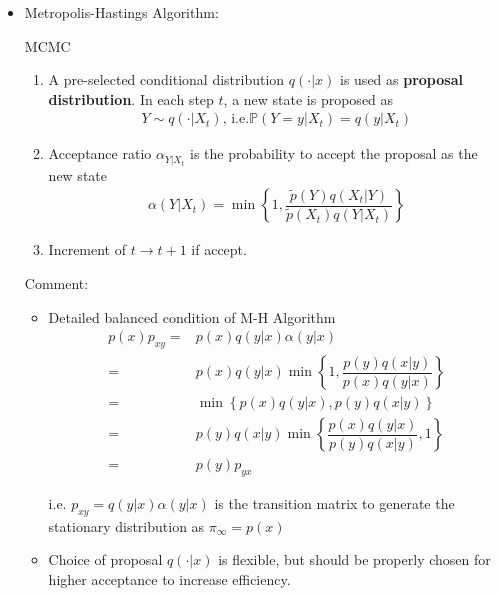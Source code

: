 \begin{itemize}[topsep=2pt,itemsep=0pt]
    \item Metropolis-Hastings Algorithm:
    \begin{algorithm}{MCMC}
    \begin{enumerate}[topsep=2pt,itemsep=2pt]
        \item A pre-selected conditional distribution $ q(\cdot|x) $ is used as \textbf{proposal distribution}. In each step $ t $, a new state is proposed as 
        \begin{align}
            Y\sim q(\cdot|X_t), \,\mathrm{i.e. }\mathbb{P}\left( Y=y|X_t \right) =q(y|X_t)
        \end{align}
        \item Acceptance ratio $ \alpha_{Y|X_t}  $ is the probability to accept the proposal as the new state
        \begin{align}
            \alpha (Y|X_t)= \min\left\{ 1,\dfrac{\tilde{p}(Y)q(X_t|Y)}{\tilde{p}(X_t)q(Y|X_t)} \right\}
        \end{align}
        \item Increment of $ t\to t+1 $ if accept.
    \end{enumerate}

    \end{algorithm}
        

    Comment: 
    \begin{itemize}[topsep=2pt,itemsep=0pt]
        \item Detailed balanced condition of M-H Algorithm
\begin{align}
    p(x)p_{xy}=&p(x)q(y|x)\alpha (y|x)\\
    =& p(x)q(y|x)\min\left\{ 1,\dfrac{p(y)q(x|y)}{p(x)q(y|x)} \right\}\\
    =&\min\left\{p(x)q(y|x), p(y)q(x|y)\right\}\\
    =&p(y)q(x|y)\min\left\{\dfrac{p(x)q(y|x)}{p(y)q(x|y)},1 \right\}\\
    =&p(y)p_{yx}
\end{align}

    i.e. $ p_{xy}=q(y|x)\alpha (y|x) $ is the transition matrix to generate the stationary distribution as $ \pi_{\infty}=p(x) $
    \item Choice of proposal $ q(\cdot|x) $ is flexible, but should be properly chosen for higher acceptance to increase efficiency. 
    \end{itemize}
    
    
    
        
\end{itemize}

